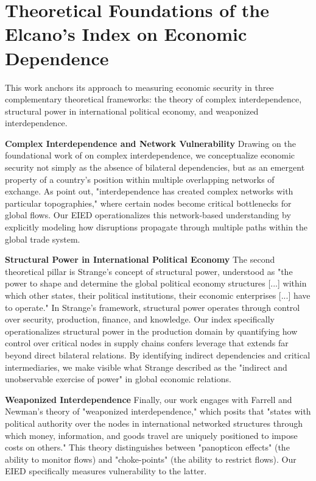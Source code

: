 \documentclass[final,1p,times,authoryear]{elsarticle}
\begin{document}
\section{Theoretical Foundations of the Elcano's Index on Economic Dependence}

This work anchors its approach to measuring economic security in three complementary theoretical frameworks: the theory of complex interdependence, structural power in international political economy, and weaponized interdependence.

\textbf{Complex Interdependence and Network Vulnerability}
Drawing on the foundational work of \cite{keohane1977power} on complex interdependence, we conceptualize economic security not simply as the absence of bilateral dependencies, but as an emergent property of a country's position within multiple overlapping networks of exchange. As \cite{farrell2019weaponized} point out, "interdependence has created complex networks with particular topographies," where certain nodes become critical bottlenecks for global flows. Our EIED operationalizes this network-based understanding by explicitly modeling how disruptions propagate through multiple paths within the global trade system.

\textbf{Structural Power in International Political Economy}
The second theoretical pillar is Strange's \citeyear{strange1988states} concept of structural power, understood as "the power to shape and determine the global political economy structures [...] within which other states, their political institutions, their economic enterprises [...] have to operate." In Strange's framework, structural power operates through control over security, production, finance, and knowledge. Our index specifically operationalizes structural power in the production domain by quantifying how control over critical nodes in supply chains confers leverage that extends far beyond direct bilateral relations. By identifying indirect dependencies and critical intermediaries, we make visible what Strange described as the "indirect and unobservable exercise of power" in global economic relations.

\textbf{Weaponized Interdependence}
Finally, our work engages with Farrell and Newman's \citeyear{farrell2019weaponized} theory of "weaponized interdependence," which posits that "states with political authority over the nodes in international networked structures through which money, information, and goods travel are uniquely positioned to impose costs on others." This theory distinguishes between "panopticon effects" (the ability to monitor flows) and "choke-points" (the ability to restrict flows). Our EIED specifically measures vulnerability to the latter.
\end{document}

